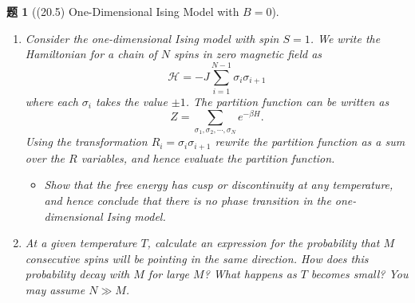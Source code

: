 \documentclass[UTF8,10pt,a4paper]{article}
\theoremstyle{Problem}
\newtheorem{prob}{题}
\theoremstyle{Solution}
\begin{document}
\begin{prob}[(20.5) One-Dimensional Ising Model with $B=0$]
    \begin{enumerate}
        \item[(a)] Consider the one-dimensional Ising model with spin $S=1$. We write the Hamiltonian for a chain of $N$ spins in zero magnetic field as
        \[
            \mathcal{H}=-J\sum_{i=1}^{N-1}\sigma_i\sigma_{i+1}
        \]
        where each $\sigma_i$ takes the value $\pm 1$. The partition function can be written as
        \[
            Z=\sum_{\sigma_1,\sigma_2,\cdots,\sigma_N}e^{-\beta H}.
        \]
    Using the transformation $R_i=\sigma_i\sigma_{i+1}$ rewrite the partition function as a sum over the $R$ variables, and hence evaluate the partition function.
    \begin{itemize}
        \item[$\triangleright$] Show that the free energy has cusp or discontinuity at any temperature, and hence conclude that there is no phase transition in the one-dimensional Ising model.
    \end{itemize}
    \item[(b)$^*$] At a given temperature $T$, calculate an expression for the probability that $M$ consecutive spins will be pointing in the same direction. How does this probability decay with $M$ for large $M$? What happens as $T$ becomes small? You may assume $N\gg M$.
    \end{enumerate}
\end{prob}
\end{document}
